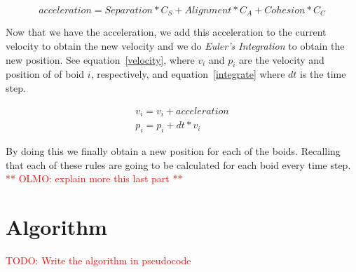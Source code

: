 \begin{equation}
\label{combine}
acceleration = Separation * C_S + Alignment * C_A + Cohesion * C_C
\end{equation}

Now that we have the acceleration, we add this acceleration to the current velocity to obtain the new velocity and we do \textit{Euler's Integration} to obtain the new position. See equation~\ref{velocity}, where $v_i$ and $p_i$ are the velocity and position of of boid $i$, respectively, and equation~\ref{integrate} where $dt$ is the time step. 

\begin{align}
\label{velocity}
v_i = v_i + acceleration\\
\label{integrate}
p_i = p_i + dt * v_i
\end{align}

By doing this we finally obtain a new position for each of the boids. Recalling that each of these rules are going to be calculated for each boid every time step. \textcolor{red}{** OLMO: explain more this last part **}

\section{Algorithm}
\textcolor{red}{TODO: Write the algorithm in pseudocode}
